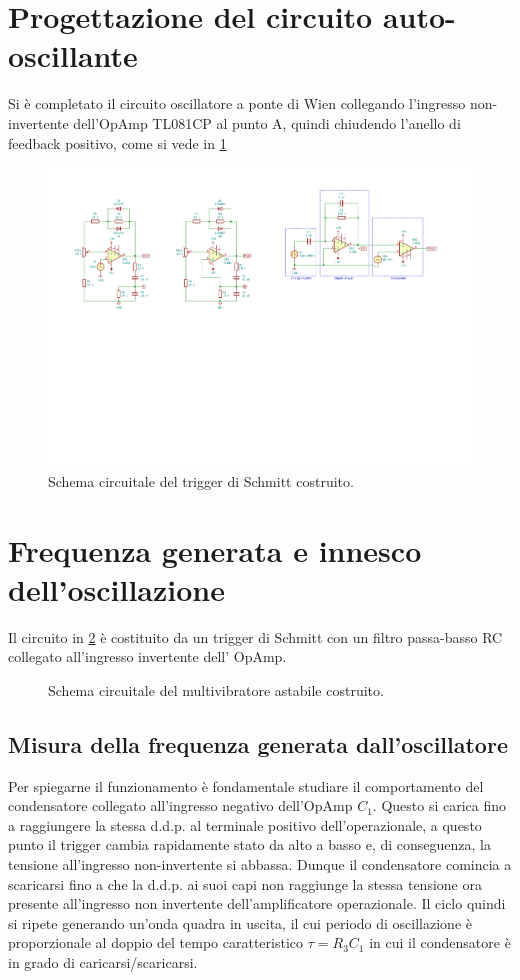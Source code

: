 \documentclass[10pt, a4paper, italian]{article}
\begin{document}
\section{Progettazione del circuito auto-oscillante}
Si è completato il circuito oscillatore a ponte di Wien collegando
l'ingresso non-invertente dell'OpAmp TL081CP al punto A, quindi chiudendo
l'anello di feedback positivo, come si vede in \cref{fig: wienschm}
\begin{figure}[htbp]
    \centering
	\includegraphics[scale=1.2]{wienschm}
    \caption{Schema circuitale del trigger di Schmitt costruito.
    \label{fig: wienschm}}
\end{figure}

\section{Frequenza generata e innesco dell'oscillazione}
Il circuito in \cref{fig: astableschm} è costituito da un trigger di
Schmitt con un filtro passa-basso RC collegato all'ingresso invertente dell'
OpAmp.
\begin{figure}[htbp]
    \centering
    \caption{Schema circuitale del multivibratore astabile costruito.
    \label{fig: astableschm}}
\end{figure}

\subsection{Misura della frequenza generata dall'oscillatore}
Per spiegarne il funzionamento è fondamentale studiare il comportamento del
condensatore collegato all'ingresso negativo dell'OpAmp $C_1$. Questo si
carica fino a raggiungere la stessa d.d.p. al terminale positivo
dell'operazionale, a questo punto il trigger cambia rapidamente stato da alto
a basso e, di conseguenza, la tensione all'ingresso non-invertente si abbassa.
Dunque il condensatore comincia a scaricarsi fino a che la d.d.p. ai suoi capi
non raggiunge la stessa tensione ora presente all'ingresso non invertente
dell'amplificatore operazionale.
Il ciclo quindi si ripete generando un'onda quadra in uscita, il cui
periodo di oscillazione è proporzionale al doppio del tempo caratteristico
$\tau = R_3 C_1$ in cui il condensatore è in grado di caricarsi/scaricarsi.
\end{document}
